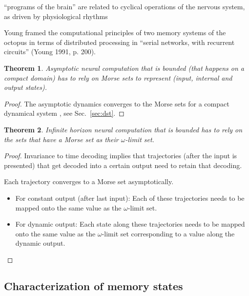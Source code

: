\documentclass{scrartcl}
\newtheorem{theorem}{Theorem}
\theoremstyle{definition}
\theoremstyle{remark}
\begin{document}
“programs of the brain” are related to cyclical operations of the nervous system, as driven by physiological rhythms

Young framed the computational principles of two memory systems of the octopus in terms of distributed processing in “serial networks, with recurrent circuits” (Young 1991, p. 200).

\begin{theorem}
Asymptotic neural computation that is bounded (that happens on a compact domain) has to rely on Morse sets to represent (input, internal and output states).
\end{theorem}

\begin{proof}
The asymptotic dynamics converges to the Morse sets for a compact dynamical system \cite{conley1978}, see Sec.~\ref{sec:dst}.
\end{proof}


\begin{theorem}	
Infinite horizon neural computation that is bounded has to rely on the sets that have a Morse set as their $\omega$-limit set.
\end{theorem}	

\begin{proof}
Invariance to time decoding implies that trajectories (after the input is presented) that get decoded into a certain output need to retain that decoding.

Each trajectory converges to a Morse set asymptotically.

\begin{itemize}
\item For constant output (after last input): Each of these trajectories needs to be mapped onto the same value as the $\omega$-limit set.
\item For dynamic output: Each state along these trajectories needs to be mapped onto the same value as the $\omega$-limit set corresponding to a value along the dynamic output. %
\end{itemize}
\end{proof}


\subsection{Characterization of memory states}
\end{document}
